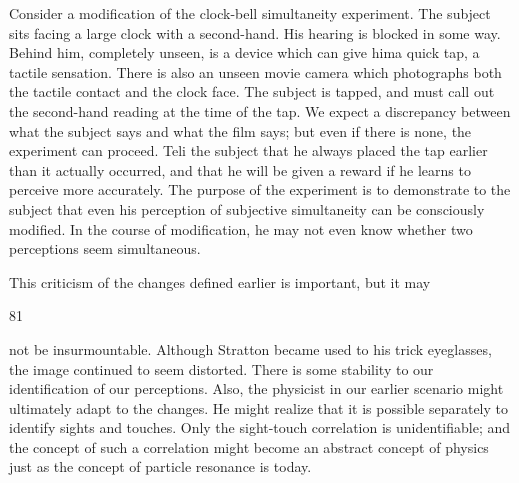 \documentclass[10pt,twoside]{memoir}
\begin{document}
\begin{enumerate}
{{{{{{{{{{{{{{{{Consider a modification of the clock-bell simultaneity experiment. The 
subject sits facing a large clock with a second-hand. His hearing is blocked in 
some way. Behind him, completely unseen, is a device which can give hima 
quick tap, a tactile sensation. There is also an unseen movie camera which 
photographs both the tactile contact and the clock face. The subject is 
tapped, and must call out the second-hand reading at the time of the tap. We 
expect a discrepancy between what the subject says and what the film says; 
but even if there is none, the experiment can proceed. Teli the subject that 
he always placed the tap earlier than it actually occurred, and that he will be 
given a reward if he learns to perceive more accurately. The purpose of the 
experiment is to demonstrate to the subject that even his perception of 
subjective simultaneity can be consciously modified. In the course of 
modification, he may not even know whether two perceptions seem 
simultaneous. 

This criticism of the changes defined earlier is important, but it may 


81 


not be insurmountable. Although Stratton became used to his trick 
eyeglasses, the image continued to seem distorted. There is some stability to 
our identification of our perceptions. Also, the physicist in our earlier 
scenario might ultimately adapt to the changes. He might realize that it is 
possible separately to identify sights and touches. Only the sight-touch 
correlation is unidentifiable; and the concept of such a correlation might 
become an abstract concept of physics just as the concept of particle 
resonance is today. 

}}}}}}}}}}}}}}}}
\end{enumerate}
\end{document}
